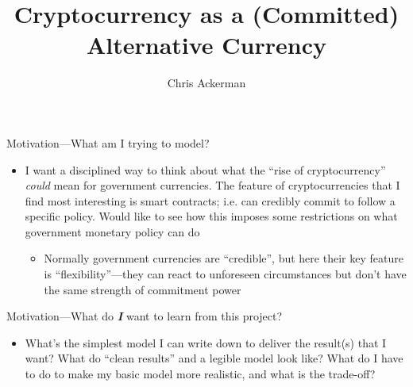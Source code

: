\documentclass[dvipsnames]{beamer}
\title{Cryptocurrency as a (Committed) Alternative Currency}
\author{Chris Ackerman}
\begin{document}
\maketitle
\begin{frame}{Motivation---What am I trying to model?}
  \begin{itemize}
  \item I want a disciplined way to think about what the ``rise of cryptocurrency'' \emph{could} mean for government currencies.
    \vitem The feature of cryptocurrencies that I find most interesting is smart contracts; i.e. can credibly commit to follow a specific policy.
    \vitem Would like to see how this imposes some restrictions on what government monetary policy can do
    \begin{itemize}
    \item Normally government currencies are ``credible'', but here their key feature is ``flexibility''---they can react to unforeseen circumstances but don't have the same strength of commitment power
    \end{itemize}
  \end{itemize}
\end{frame}
%
\begin{frame}{Motivation---What do \textbf{\emph{I}} want to learn from this project?}
  \begin{itemize}
  \item What's the simplest model I can write down to deliver the result(s) that I want?
    \vitem What do ``clean results'' and a legible model look like?
    \vitem What do I have to do to make my basic model more realistic, and what is the trade-off?
  \end{itemize}
\end{frame}
%
\end{document}
